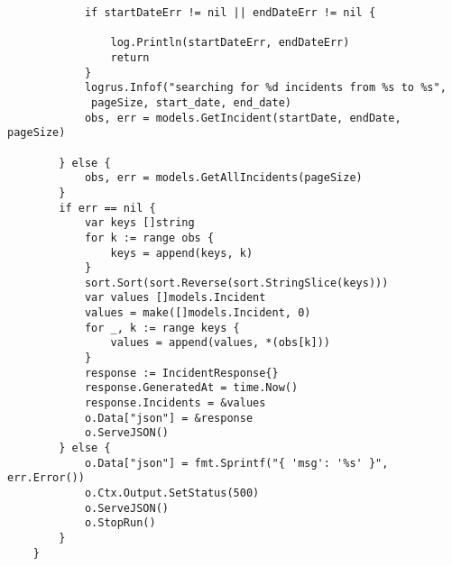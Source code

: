 \begin{verbatim}
            if startDateErr != nil || endDateErr != nil {
    
                log.Println(startDateErr, endDateErr)
                return
            }
            logrus.Infof("searching for %d incidents from %s to %s",
             pageSize, start_date, end_date)
            obs, err = models.GetIncident(startDate, endDate, pageSize)
    
        } else {
            obs, err = models.GetAllIncidents(pageSize)
        }
        if err == nil {
            var keys []string
            for k := range obs {
                keys = append(keys, k)
            }
            sort.Sort(sort.Reverse(sort.StringSlice(keys)))
            var values []models.Incident
            values = make([]models.Incident, 0)
            for _, k := range keys {
                values = append(values, *(obs[k]))
            }
            response := IncidentResponse{}
            response.GeneratedAt = time.Now()
            response.Incidents = &values
            o.Data["json"] = &response
            o.ServeJSON()
        } else {
            o.Data["json"] = fmt.Sprintf("{ 'msg': '%s' }", err.Error())
            o.Ctx.Output.SetStatus(500)
            o.ServeJSON()
            o.StopRun()
        }
    }
    
   
\end{verbatim}



